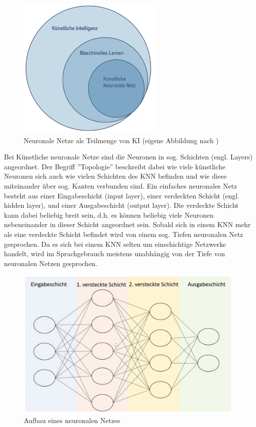 \documentclass[a4paper,12pt, german]{report}
\begin{document}
\begin{figure}[H]
  \center
 \includegraphics[width=7cm]{images/EinordnungKNN.pptx.png}
  \caption[Neuronale Netze als Teilmenge von KI]{Neuronale Netze als Teilmenge von KI (eigene Abbildung nach \cite{17})}
\end{figure}

Bei Künstliche neuronale Netze sind die Neuronen in sog. Schichten (engl. Layers) angeordnet. Der Begriff ''Topologie'' beschreibt dabei wie viele künstliche Neuronen sich auch wie vielen Schichten des KNN befinden und wie diese miteinander über sog. Kanten verbunden sind. Ein einfaches neuronales Netz besteht aus einer Eingabeschicht (input layer), einer verdeckten Schicht (engl. hidden layer), und einer Ausgabeschicht (output layer). Die verdeckte Schicht kann dabei beliebig breit sein, d.h. es können beliebig viele Neuronen nebeneinander in dieser Schicht angeordnet sein. Sobald sich in einem KNN mehr als eine verdeckte Schicht befindet wird von einem sog. Tiefen neuronalen Netz gesprochen. Da es sich bei einem KNN selten um einschichtige Netzwerke handelt, wird im Sprachgebrauch meistens unabhängig von der Tiefe von neuronalen Netzen gesprochen. 

\begin{figure}[H]
  \center
 \includegraphics[width=12cm]{images/KNN-Schichten.png}
  \caption[Aufbau eines neuronalen Netzes]{Aufbau eines neuronalen Netzes \cite{17}}
\end{figure}
\end{document}
